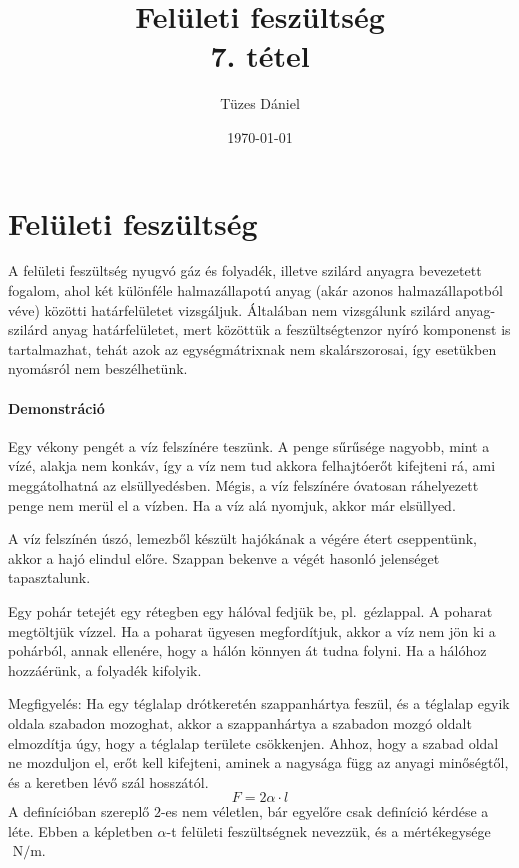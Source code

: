 \documentclass[12pt,a4paper]{scrartcl}
\title{Felületi feszültség\\{\small{7. tétel}}}
\author{Tüzes Dániel}
\date{\today}
\begin{document}
\maketitle

\section{Felületi feszültség}
A felületi feszültség nyugvó gáz és folyadék, illetve szilárd anyagra bevezetett fogalom, ahol két különféle halmazállapotú anyag (akár azonos halmazállapotból véve) közötti határfelületet vizsgáljuk. Általában nem vizsgálunk szilárd anyag-szilárd anyag határfelületet, mert közöttük a feszültségtenzor nyíró komponenst is tartalmazhat, tehát azok az egységmátrixnak nem skalárszorosai, így esetükben nyomásról nem beszélhetünk.

\footnotesize
\paragraph{Demonstráció} Egy vékony pengét a víz felszínére teszünk. A penge sűrűsége nagyobb, mint a vízé, alakja nem konkáv, így a víz nem tud akkora felhajtóerőt kifejteni rá, ami meggátolhatná az elsüllyedésben. Mégis, a víz felszínére óvatosan ráhelyezett penge nem merül el a vízben. Ha a víz alá nyomjuk, akkor már elsüllyed.

A víz felszínén úszó, lemezből készült hajókának a végére étert cseppentünk, akkor a hajó elindul előre. Szappan bekenve a végét hasonló jelenséget tapasztalunk.

Egy pohár tetejét egy rétegben egy hálóval fedjük be, pl.\ gézlappal. A poharat megtöltjük vízzel. Ha a poharat ügyesen megfordítjuk, akkor a víz nem jön ki a pohárból, annak ellenére, hogy a hálón könnyen át tudna folyni. Ha a hálóhoz hozzáérünk, a folyadék kifolyik.
\normalsize

Megfigyelés: Ha egy téglalap drótkeretén szappanhártya feszül, és a téglalap egyik oldala szabadon mozoghat, akkor a szappanhártya a szabadon mozgó oldalt elmozdítja úgy, hogy a téglalap területe csökkenjen. Ahhoz, hogy a szabad oldal ne mozduljon el, erőt kell kifejteni, aminek a nagysága függ az anyagi minőségtől, és a keretben lévő szál hosszától.
\[F = 2\alpha  \cdot l\]
A definícióban szereplő $2$-es nem véletlen, bár egyelőre csak definíció kérdése a léte. Ebben a képletben $\alpha$-t felületi feszültségnek nevezzük, és a  mértékegysége $\text{ N}/\text{m}$.
\end{document}
